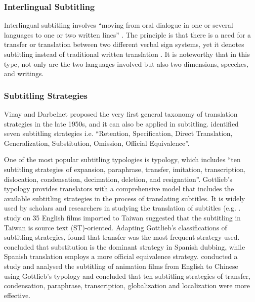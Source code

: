 \documentclass[english]{textolivre}
\begin{document}
\subsubsection{Interlingual Subtitling}\label{sec-autores}
Interlingual subtitling involves “moving from oral dialogue in one or several languages to one or two written lines” \cite[p. 274]{gambier_position_2013}. The principle is that there is a need for a transfer or translation between two different verbal sign systems, yet it denotes subtitling instead of traditional written translation \cite{liu_foreign_2015}. It is noteworthy that in this type, not only are the two languages involved but also two dimensions, speeches, and writings. 

\subsubsection{Subtitling Strategies}\label{sec-idioma}
Vinay and Darbelnet proposed the very first general taxonomy of translation strategies in the late 1950s, and it can also be applied in subtitling. \textcite[p.~1]{pedersen_how_2017} identified seven subtitling strategies i.e. “Retention, Specification, Direct Translation, Generalization, Substitution, Omission, Official Equivalence”. 

One of the most popular subtitling typologies is \textcite[p. 163]{gottlieb_subtitles_1997} typology, which includes “ten subtitling strategies of expansion, paraphrase, transfer, imitation, transcription, dislocation, condensation, decimation, deletion, and resignation”. Gottlieb's typology provides translators with a comprehensive model that includes the available subtitling strategies in the process of translating subtitles. It is widely used by scholars and researchers in studying the translation of subtitles (e.g. \cite{ghaemi_strategies_2011,bak_analysis_2016,jin_comparative_2018,usroh_subtitling_2017}. \textcite{cheng_chinese_2014} study on 35 English films imported to Taiwan suggested that the subtitling in Taiwan is source text (ST)-oriented. Adapting Gottlieb's classifications of subtitling strategies, \textcite{kianbakht_audiovisual_2015} found that transfer was the most frequent strategy used. \textcite{bosch_translation_2016} concluded that substitution is the dominant strategy in Spanish dubbing, while Spanish translation employs a more official equivalence strategy. \cite{jin_comparative_2018} conducted a study and analysed the subtitling of animation films from English to Chinese using Gottlieb's typology and concluded that ten subtitling strategies of transfer, condensation, paraphrase, transcription, globalization and localization were more effective.
\end{document}
